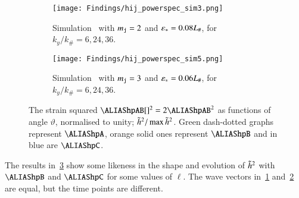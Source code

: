 
    \begin{figure}[h!]
        \centering
        \begin{subfigure}[b]{\linewidth}
            \centering
            \texttt{[image: Findings/hij\_powerspec\_sim3.png]}
        \caption{Simulation~ with $m_{\mathtt{j}}=2$ and $\varepsilon_\ast=0.08L_\#$, for $k_y/k_\#=6,24,36$. }
        \label{fig:results:h11:hij_powerspec_sim3}
        \end{subfigure}
        \hfill
        \begin{subfigure}[b]{\linewidth}
            \texttt{[image: Findings/hij\_powerspec\_sim5.png]}
        \caption{Simulation~ with $m_{\mathtt{j}}=3$ and $\varepsilon_\ast=0.06L_\#$, for $k_y/k_\#=6,24,36$.}
        \label{fig:results:h11:hij_powerspec_sim5}
        \end{subfigure}
        \caption{%
        The strain squared $\hpAB[]^2 = 2\hpAB^2$ as functions of angle $\vartheta$, normalised to unity; $\tilde{h}^2/\max{\tilde{h}^2}$. %
        Green dash-dotted graphs represent $\hpA$, orange solid ones represent $\hpB$ and in blue are $\hpC$.}
        \label{fig:results:h11:hij_powerspecs}
    \end{figure}




    The results in~\cref{fig:results:h11:hij_powerspecs} show some likeness in the shape and evolution of $\tilde{h}^2$ with $\hpB$ and $\hpC$ for some values of $\ell$. The wave vectors in~\cref{fig:results:h11:hij_powerspec_sim3} and~\cref{fig:results:h11:hij_powerspec_sim5} are equal, but the time points are different.

    















